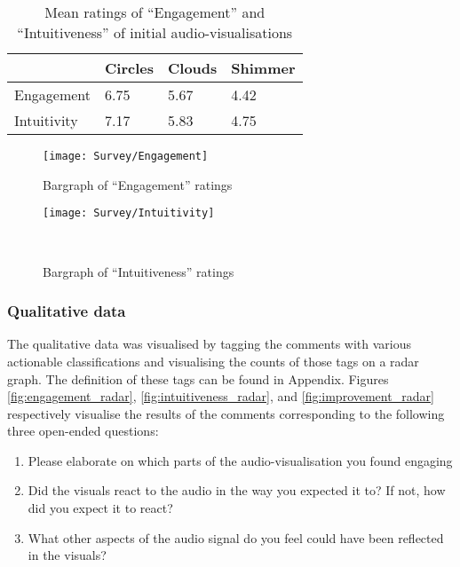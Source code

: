 \documentclass[../initial_thesis.tex]{subfiles}
\begin{document}
\begin{table}[]
  \centering
\begin{tabular}{|l|l|l|l|}
\hline
\rowcolor[HTML]{FFCE93} 
            & Circles & Clouds & Shimmer \\ \hline
Engagement  & 6.75    & 5.67   & 4.42    \\ \hline
Intuitivity & 7.17    & 5.83   & 4.75    \\ \hline
\end{tabular}
\caption{Mean ratings of ``Engagement'' and ``Intuitiveness'' of initial audio-visualisations}
\label{tab:meantable}
\end{table}

\begin{figure}
  \texttt{[image: Survey/Engagement]}
  \caption{Bargraph of ``Engagement'' ratings}
  \label{fig:engagement_ratings}
\end{figure}

\begin{figure}
  \texttt{[image: Survey/Intuitivity]}
  \caption{Bargraph of ``Intuitiveness'' ratings}\
  \label{fig:intuitive_ratings}
\end{figure}

\subsubsection{Qualitative data}
The qualitative data was visualised by tagging the comments with various actionable classifications and visualising the counts of those tags on a radar graph. The definition of these tags can be found in Appendix. %
Figures \ref{fig:engagement_radar}, \ref{fig:intuitiveness_radar}, and \ref{fig:improvement_radar} respectively visualise the results of the comments corresponding to the following three open-ended questions:

\begin{enumerate}
\item {Please elaborate on which parts of the audio-visualisation you found engaging}
\item {Did the visuals react to the audio in the way you expected it to? If not, how did you expect it to react?}
\item {What other aspects of the audio signal do you feel could have been reflected in the visuals?}
\end{enumerate}
\end{document}
